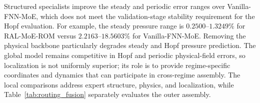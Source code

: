 Structured specialists improve the steady and periodic error ranges over
Vanilla-FNN-MoE, which does not meet the validation-stage stability requirement
for the Hopf evaluation. For example,
the steady pressure range is $0.2500$--$1.3249\%$ for RAL-MoE-ROM versus
$2.2163$--$18.5603\%$ for Vanilla-FNN-MoE. Removing the physical backbone
particularly degrades steady and Hopf pressure prediction. The global model
remains competitive in Hopf and periodic physical-field errors, so
localization is not uniformly superior; its role is to provide regime-specific
coordinates and dynamics that can participate in cross-regime assembly.
The local comparisons address expert structure, physics, and localization,
while Table~\ref{tab:routing_fusion} separately evaluates the outer assembly.
